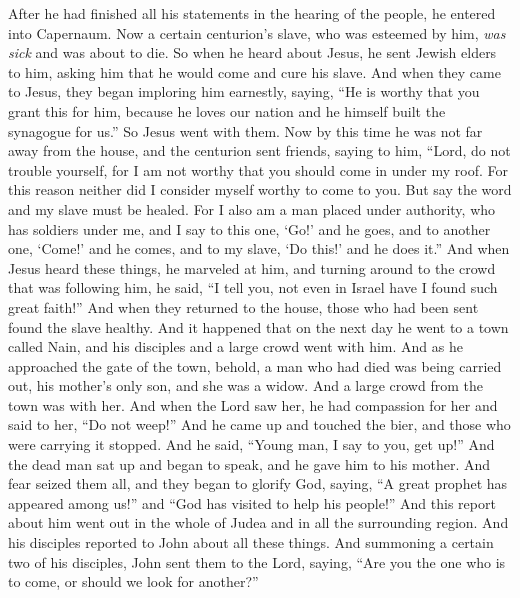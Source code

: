 \begin{biblechapter} %
 After he had finished all his statements in the hearing of the people, he entered into Capernaum.
\verse Now a certain centurion’s slave, who was esteemed by him, \textit{was sick} and was about to die.
\verse So when he heard about Jesus, he sent Jewish elders to him, asking him that he would come and cure his slave.
\verse And when they came to Jesus, they began imploring him earnestly, saying, “He is worthy that you grant this for him,
\verse because he loves our nation and he himself built the synagogue for us.”
\verse So Jesus went with them. Now by this time he was not far away from the house, and the centurion sent friends, saying to him, “Lord, do not trouble yourself, for I am not worthy that you should come in under my roof.
\verse For this reason neither did I consider myself worthy to come to you. But say the word and my slave must be healed.
\verse For I also am a man placed under authority, who has soldiers under me, and I say to this one, ‘Go!’ and he goes, and to another one, ‘Come!’ and he comes, and to my slave, ‘Do this!’ and he does it.”
\verse And when Jesus heard these things, he marveled at him, and turning around to the crowd that was following him, he said, “I tell you, not even in Israel have I found such great faith!”
\verse And when they returned to the house, those who had been sent found the slave healthy.
 And it happened that on the next day he went to a town called Nain, and his disciples and a large crowd went with him.
\verse And as he approached the gate of the town, behold, a man who had died was being carried out, his mother’s only son, and she was a widow. And a large crowd from the town was with her.
\verse And when the Lord saw her, he had compassion for her and said to her, “Do not weep!”
\verse And he came up and touched the bier, and those who were carrying it stopped. And he said, “Young man, I say to you, get up!”
\verse And the dead man sat up and began to speak, and he gave him to his mother.
\verse And fear seized them all, and they began to glorify God, saying, “A great prophet has appeared among us!” and “God has visited to help his people!”
\verse And this report about him went out in the whole of Judea and in all the surrounding region.
 And his disciples reported to John about all these things. And summoning a certain two of his disciples, John
\verse sent them to the Lord, saying, “Are you the one who is to come, or should we look for another?”

\end{biblechapter}
